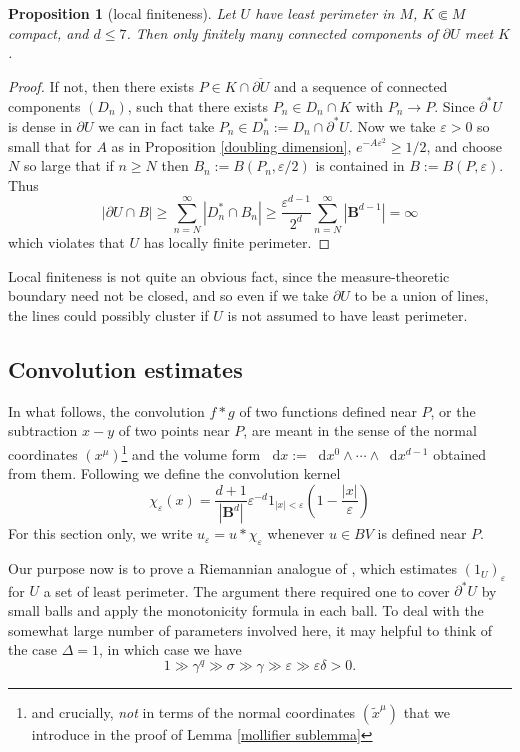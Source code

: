 \documentclass[reqno,12pt,letterpaper]{amsart}
\newcommand{\Ball}{\mathbf{B}}
\newcommand*\dif{\mathop{}\!\mathrm{d}}
\newtheorem{proposition}[theorem]{Proposition}
\theoremstyle{definition}
\numberwithin{equation}{section}
\begin{document}
\begin{proposition}[local finiteness]\label{local finiteness}
Let $U$ have least perimeter in $M$, $K \Subset M$ compact, and $d \leq 7$. Then only finitely many connected components of $\partial U$ meet $K$.
\end{proposition}
\begin{proof}
If not, then there exists $P \in K \cap \overline{\partial U}$ and a sequence of connected components $(D_n)$, such that there exists $P_n \in D_n \cap K$ with $P_n \to P$.
Since $\partial^* U$ is dense in $\partial U$ we can in fact take $P_n \in D_n^* := D_n \cap \partial^* U$.
Now we take $\varepsilon > 0$ so small that for $A$ as in Proposition \ref{doubling dimension}, $e^{-A\varepsilon^2} \geq 1/2$, and choose $N$ so large that if $n \geq N$ then $B_n := B(P_n, \varepsilon/2)$ is contained in $B := B(P, \varepsilon)$.
Thus
$$|\partial U \cap B| \geq \sum_{n=N}^\infty |D_n^* \cap B_n| \geq \frac{\varepsilon^{d - 1}}{2^d} \sum_{n=N}^\infty |\Ball^{d - 1}| = \infty$$
which violates that $U$ has locally finite perimeter.
\end{proof}

Local finiteness is not quite an obvious fact, since the measure-theoretic boundary need not be closed, and so even if we take $\partial U$ to be a union of lines, the lines could possibly cluster if $U$ is not assumed to have least perimeter.

\subsection{Convolution estimates}
In what follows, the convolution $f * g$ of two functions defined near $P$, or the subtraction $x - y$ of two points near $P$, are meant in the sense of the normal coordinates $(x^\mu)$\footnote{and crucially, \emph{not} in terms of the normal coordinates $(\tilde x^\mu)$ that we introduce in the proof of Lemma \ref{mollifier sublemma}} and the volume form $\dif x := \dif x^0 \wedge \cdots \wedge \dif x^{d - 1}$ obtained from them. Following \cite[Chapter 7]{Giusti77} we define the convolution kernel
$$\chi_\varepsilon(x) = \frac{d + 1}{|\Ball^d|} \varepsilon^{-d}1_{|x| < \varepsilon} \left(1 - \frac{|x|}{\varepsilon}\right)$$
For this section only, we write $u_\varepsilon = u * \chi_\varepsilon$ whenever $u \in BV$ is defined near $P$.

Our purpose now is to prove a Riemannian analogue of \cite[Theorem 7.3]{Giusti77}, which estimates $(1_U)_\varepsilon$ for $U$ a set of least perimeter.
The argument there required one to cover $\partial^* U$ by small balls and apply the monotonicity formula in each ball.
To deal with the somewhat large number of parameters involved here, it may helpful to think of the case $\Delta = 1$, in which case we have
$$1 \gg \gamma^q \gg \sigma \gg \gamma \gg \varepsilon \gg \varepsilon \delta > 0.$$
\end{document}

